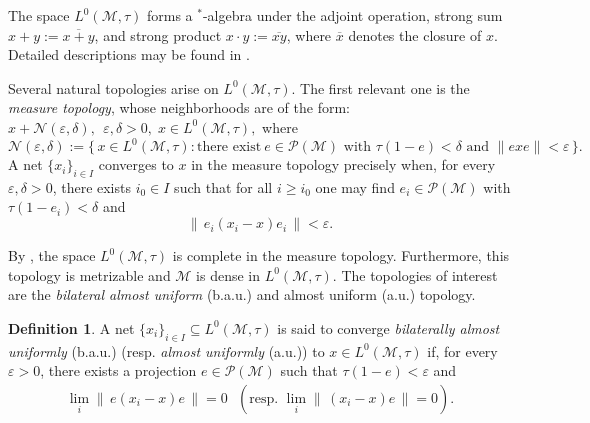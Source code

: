 \documentclass[11pt]{amsart}
\theoremstyle{definition}
\newtheorem{defn}[thm]{Definition}
\theoremstyle{myremark}
\numberwithin{equation}{section}
\begin{document}
The space \(L^{0}(\mathcal{M},\tau)\) forms a \(^*\)-algebra under the adjoint operation, strong sum \(x+y := \overline{x+y}\), and strong product \(x \cdot y := \overline{xy}\), where \(\overline{x}\) denotes the closure of \(x\). Detailed descriptions may be found in \cite{stratila2019lectures, hiai2021lectures}.

Several natural topologies arise on \(L^{0}(\mathcal{M},\tau)\). The first relevant one is the \emph{measure topology}, whose neighborhoods are of the form:  $ x + \mathcal{N}(\varepsilon,\delta),
~~ \varepsilon,\delta > 0,\; x \in L^{0}(\mathcal{M},\tau),$
where
\[
\mathcal{N}(\varepsilon,\delta)
 := \{\, x \in L^{0}(\mathcal{M},\tau) :\text{there exist}~ e \in \mathcal{P}(\mathcal{M}) 
 \text{ with } \tau(1-e) < \delta \text{ and } \|exe\| < \varepsilon \,\}.
\]
A net \(\{x_i\}_{i\in I}\) converges to \(x\) in the measure topology precisely when, for every \(\varepsilon,\delta>0\), there exists \(i_0\in I\) such that for all \(i\ge i_0\) one may find \(e_i\in \mathcal{P}(\mathcal{M})\) with \(\tau(1-e_i) < \delta\) and
\[
\|\, e_i (x_i - x)e_i \,\| < \varepsilon.
\]

\noindent By \cite[Theorem 1]{nelson1974notes}, the space \(L^{0}(\mathcal{M},\tau)\) is complete in the measure topology. Furthermore, this topology is metrizable and  \(\mathcal{M}\) is dense in \(L^{0}(\mathcal{M},\tau)\).
The topologies  of interest are  the \emph{bilateral almost uniform} (b.a.u.)  and  almost uniform (a.u.) topology.

\begin{defn}\label{bau conv defn}
A net \(\{x_i\}_{i\in I}\subseteq L^{0}(\mathcal{M},\tau)\) is said to converge \emph{bilaterally almost uniformly} (b.a.u.) (resp. \emph{almost uniformly} (a.u.)) to \(x\in L^{0}(\mathcal{M},\tau)\) if, for every \(\varepsilon>0\), there exists a projection \(e \in \mathcal{P}(\mathcal{M})\) such that \(\tau(1-e) < \varepsilon\) and 
\begin{align*}
\lim_{i} \|\, e(x_i - x)e \,\| = 0 ~~~ (\text{resp. }  \lim_{i} \|\, (x_i - x)e \,\| = 0).
\end{align*}
\end{defn}
\end{document}
